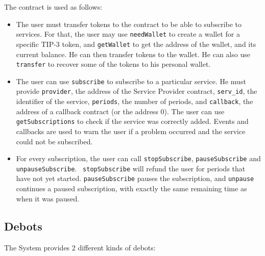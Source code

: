 \documentclass[10pt,a4paper]{article}
\begin{document}
\begin{description}
  The contract is used as follows:
  \begin{itemize}
  \item The user must transfer tokens to the contract to be able to
    subscribe to services. For that, the user may use {\tt needWallet}
    to create a wallet for a specific TIP-3 token, and {\tt getWallet}
    to get the address of the wallet, and its current balance. He can
    then transfer tokens to the wallet. He can also use {\tt transfer}
    to recover some of the tokens to his personal wallet.
  \item The user can use {\tt subscribe} to subscribe to a particular
    service. He must provide {\tt provider}, the address of the
    Service Provider contract, {\tt serv\_id}, the identifier of the
    service, {\tt periods}, the number of periods, and {\tt callback},
    the address of a callback contract (or the address 0). The user
    can use {\tt getSubscriptions} to check if the service was
    correctly added. Events and callbacks are used to warn the user if
    a problem occurred and the service could not be subscribed.
  \item For every subscription, the user can call {\tt stopSubscribe},
    {\tt pauseSubscribe} and {\tt unpauseSubscribe}. {\tt
      stopSubscribe} will refund the user for periods that have not
    yet started. {\tt pauseSubscribe} pauses the subscription, and
    {\tt unpause} continues a paused subscription, with exactly the
    same remaining time as when it was paused.
  \end{itemize}
  
\end{description}

\subsection{Debots}

The System provides 2 different kinds of debots:
\end{document}
